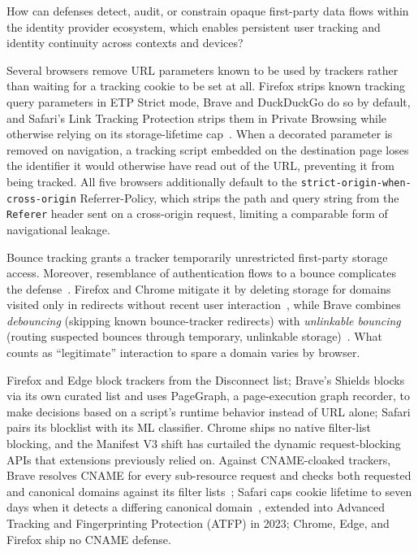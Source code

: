 \begin{opbox}
How can defenses detect, audit, or constrain opaque first-party data flows within the identity provider ecosystem, which enables persistent user tracking and identity continuity across contexts and devices?
\end{opbox}


%
Several browsers remove URL parameters known to be used by trackers rather than waiting for a tracking cookie to be set at all. 
%
Firefox strips known tracking query parameters in ETP Strict mode, Brave and DuckDuckGo do so by default, and Safari's Link Tracking Protection strips them in Private Browsing while otherwise relying on its storage-lifetime cap~\cite{TrackingPreventionWebKit2020}.
%
When a decorated parameter is removed on navigation, a tracking script embedded on the destination page loses the identifier it would otherwise have read out of the URL, preventing it from being tracked.
%
All five browsers additionally default to the \texttt{strict-origin-when-cross-origin} Referrer-Policy, which strips the path and query string from the \texttt{Referer} header sent on a cross-origin request, limiting a comparable form of navigational leakage.

%
Bounce tracking grants a tracker temporarily unrestricted first-party storage access. 
%
Moreover, resemblance of authentication flows to a bounce complicates the defense~\cite{kellyBounceTrackingMitigations2022}.
%
Firefox and Chrome mitigate it by deleting storage for domains visited only in redirects without recent user interaction~\cite{snyderNavigationalTrackingMitigations2024}, while Brave combines \textit{debouncing} (skipping known bounce-tracker redirects) with \textit{unlinkable bouncing} (routing suspected bounces through temporary, unlinkable storage)~\cite{braveprivacyteamUnlinkableBouncingMore2022}.
%
What counts as ``legitimate'' interaction to spare a domain varies by browser.


%
Firefox and Edge block trackers from the Disconnect list; Brave's Shields blocks via its own curated list and uses PageGraph, a page-execution graph recorder, to make decisions based on a script's runtime behavior instead of URL alone; Safari pairs its blocklist with its ML classifier.
%
Chrome ships no native filter-list blocking, and the Manifest V3 shift has curtailed the dynamic request-blocking APIs that extensions previously relied on.
%
Against CNAME-cloaked trackers, Brave resolves CNAME for every sub-resource request and checks both requested and canonical domains against its filter lists~\cite{bravePrivacyProtectionSecurity}; Safari caps cookie lifetime to seven days when it detects a differing canonical domain~\cite{TrackingPreventionWebKit2020}, extended into Advanced Tracking and Fingerprinting Protection (ATFP) in 2023; Chrome, Edge, and Firefox ship no CNAME defense.


